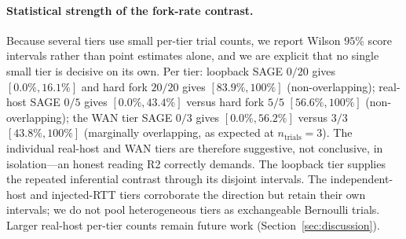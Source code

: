 \documentclass[journal]{IEEEtran}
\theoremstyle{definition}
\theoremstyle{remark}
\begin{document}
\paragraph{Statistical strength of the fork-rate contrast.}
Because several tiers use small per-tier trial counts, we report Wilson $95\%$ score
intervals rather than point estimates alone, and we are explicit that no single small
tier is decisive on its own. Per tier: loopback SAGE $0/20$ gives $[0.0\%,16.1\%]$ and
hard fork $20/20$ gives $[83.9\%,100\%]$ (non-overlapping); real-host SAGE $0/5$ gives
$[0.0\%,43.4\%]$ versus hard fork $5/5$ $[56.6\%,100\%]$ (non-overlapping); the WAN tier
SAGE $0/3$ gives $[0.0\%,56.2\%]$ versus $3/3$ $[43.8\%,100\%]$ (marginally overlapping,
as expected at $n_{\mathrm{trials}}{=}3$). The individual real-host and WAN tiers are
therefore suggestive, not conclusive, in isolation---an honest reading R2 correctly
demands. The loopback tier supplies the repeated inferential contrast through its disjoint intervals.
The independent-host and injected-RTT tiers corroborate the direction but retain their own intervals;
we do not pool heterogeneous tiers as exchangeable Bernoulli trials. Larger real-host per-tier counts
remain future work (Section~\ref{sec:discussion}).
\end{document}

